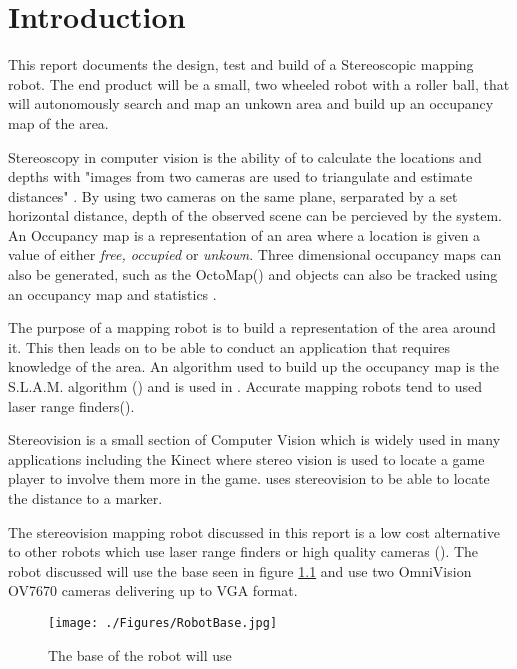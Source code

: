 \chapter{Introduction} \label{Chapter:Introduction}

%
%
%
%


This report documents the design, test and build of a Stereoscopic mapping robot. The end product will be a small, two wheeled robot with a roller ball, that will autonomously search and map an unkown area and build up an occupancy map of the area. 

Stereoscopy in computer vision is the ability of to calculate the locations and depths with "images from two cameras are used to triangulate and estimate distances" \cite{Saxena:DepthEstimation}. By using two cameras on the same plane, serparated by a set horizontal distance, depth of the observed scene can be percieved by the system.
An Occupancy map is a representation of an area where a location is given a value of either \textit{free, occupied} or \textit{unkown}.  Three dimensional occupancy maps can also be generated, such as the OctoMap(\cite{octomap}) and objects can also be tracked using an occupancy map and statistics \cite{Fleuret:OccupancyMap}. 

The purpose of a mapping robot is to build a representation of the area around it. This then leads on to be able to conduct an application that requires knowledge of the area. An algorithm used to build up the occupancy map is the S.L.A.M. algorithm (\cite{Thrun:SLAM}) and is used in \cite{Se:MappingRobot}. Accurate mapping robots tend to used laser range finders(\cite{Ruhnke:LaserMapping}).

Stereovision is a small section of Computer Vision which is widely used in many applications including the Kinect \cite{Microsoft:Kinect} where stereo vision is used to locate a game player to involve them more in the game. \cite{Mrovlje:Distance_Stereoscopic} uses stereovision to be able to locate the distance to a marker.

The stereovision mapping robot discussed in this report is a low cost alternative to other robots which use laser range finders or high quality cameras (\cite{Se:MappingRobot}). The robot discussed will use the base seen in figure \ref{fig:RobotBase} and use two OmniVision OV7670 cameras delivering up to VGA format.

\begin{figure}
\texttt{[image: ./Figures/RobotBase.jpg]}
\caption{The base of the robot will use}
\label{fig:RobotBase}
\end{figure}